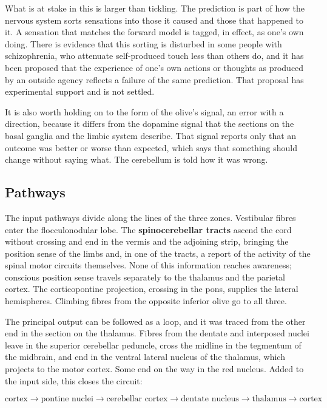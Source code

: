 \documentclass[11pt]{article}
\begin{document}
What is at stake in this is larger than tickling. The prediction is part of how the nervous system sorts sensations into those it caused and those that happened to it. A sensation that matches the forward model is tagged, in effect, as one's own doing. There is evidence that this sorting is disturbed in some people with schizophrenia, who attenuate self-produced touch less than others do, and it has been proposed that the experience of one's own actions or thoughts as produced by an outside agency reflects a failure of the same prediction. That proposal has experimental support and is not settled.

It is also worth holding on to the form of the olive's signal, an error with a direction, because it differs from the dopamine signal that the sections on the basal ganglia and the limbic system describe. That signal reports only that an outcome was better or worse than expected, which says that something should change without saying what. The cerebellum is told how it was wrong.

\subsection{Pathways}

The input pathways divide along the lines of the three zones. Vestibular fibres enter the flocculonodular lobe. The \textbf{spinocerebellar tracts} ascend the cord without crossing and end in the vermis and the adjoining strip, bringing the position sense of the limbs and, in one of the tracts, a report of the activity of the spinal motor circuits themselves. None of this information reaches awareness; conscious position sense travels separately to the thalamus and the parietal cortex. The corticopontine projection, crossing in the pons, supplies the lateral hemispheres. Climbing fibres from the opposite inferior olive go to all three.

The principal output can be followed as a loop, and it was traced from the other end in the section on the thalamus. Fibres from the dentate and interposed nuclei leave in the superior cerebellar peduncle, cross the midline in the tegmentum of the midbrain, and end in the ventral lateral nucleus of the thalamus, which projects to the motor cortex. Some end on the way in the red nucleus. Added to the input side, this closes the circuit:

\[
\text{cortex} \rightarrow \text{pontine nuclei} \rightarrow \text{cerebellar cortex} \rightarrow \text{dentate nucleus} \rightarrow \text{thalamus} \rightarrow \text{cortex}
\]
\end{document}
